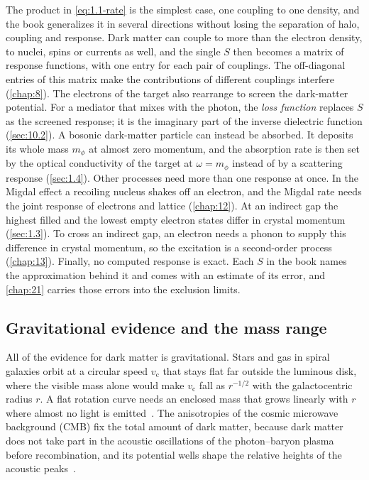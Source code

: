 The product in \cref{eq:1.1-rate} is the simplest case, one coupling to one density, and the book generalizes it in several directions without losing the separation of halo, coupling and response. Dark matter can couple to more than the electron density, to nuclei, spins or currents as well, and the single $S$ then becomes a matrix of response functions, with one entry for each pair of couplings. The off-diagonal entries of this matrix make the contributions of different couplings interfere (\cref{chap:8}). The electrons of the target also rearrange to screen the dark-matter potential. For a mediator that mixes with the photon, the \emph{loss function} replaces $S$ as the screened response; it is the imaginary part of the inverse dielectric function (\cref{sec:10.2}). A bosonic dark-matter particle can instead be absorbed. It deposits its whole mass $m_\phi$ at almost zero momentum, and the absorption rate is then set by the optical conductivity of the target at $\omega = m_\phi$ instead of by a scattering response (\cref{sec:1.4}). Other processes need more than one response at once. In the Migdal effect a recoiling nucleus shakes off an electron, and the Migdal rate needs the joint response of electrons and lattice (\cref{chap:12}). At an indirect gap the highest filled and the lowest empty electron states differ in crystal momentum (\cref{sec:1.3}). To cross an indirect gap, an electron needs a phonon to supply this difference in crystal momentum, so the excitation is a second-order process (\cref{chap:13}). Finally, no computed response is exact. Each $S$ in the book names the approximation behind it and comes with an estimate of its error, and \cref{chap:21} carries those errors into the exclusion limits.

\subsection{Gravitational evidence and the mass range}

All of the evidence for dark matter is gravitational. Stars and gas in spiral galaxies orbit at a circular speed $v_{\mathrm{c}}$ that stays flat far outside the luminous disk, where the visible mass alone would make $v_{\mathrm{c}}$ fall as $r^{-1/2}$ with the galactocentric radius $r$. A flat rotation curve needs an enclosed mass that grows linearly with $r$ where almost no light is emitted~\cite{rubin1980rotational,bertone2018history}. The anisotropies of the cosmic microwave background (CMB) fix the total amount of dark matter, because dark matter does not take part in the acoustic oscillations of the photon--baryon plasma before recombination, and its potential wells shape the relative heights of the acoustic peaks~\cite{aghanim2020planck}.

